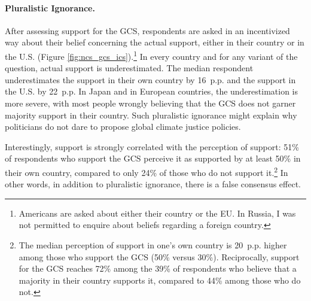 \documentclass[12pt,english]{article}
\begin{document}
\begin{bibunit}
\paragraph{Pluralistic Ignorance.} 
After assessing support for the GCS, respondents are asked in an incentivized way about their belief concerning the actual support, either in their country or in the U.S. (Figure \ref{fig:ncs_gcs_ics}).\footnote{Americans are asked about either their country or the EU. In Russia, I was not permitted to enquire about beliefs regarding a foreign country.} 
In every country and for any variant of the question, actual support is underestimated. The median respondent underestimates the support in their own country by 16~p.p. and the support in the U.S. by 22~p.p. In Japan and in European countries, the underestimation is more severe, with most people wrongly believing that the GCS does not garner majority support in their country. Such pluralistic ignorance might explain why politicians do not dare to propose global climate justice policies. 

Interestingly, support is strongly correlated with the perception of support: 51\% of respondents who support the GCS perceive it as supported by at least 50\% in their own country, compared to only 24\% of those who do not support it.\footnote{The median perception of support in one's own country is 20~p.p. higher among those who support the GCS (50\% versus 30\%). Reciprocally, support for the GCS reaches 72\% among the 39\% of respondents who believe that a majority in their country supports it, compared to 44\% among those who do not.} In other words, in addition to pluralistic ignorance, there is a false consensus effect. 


\end{bibunit}
\end{document}
